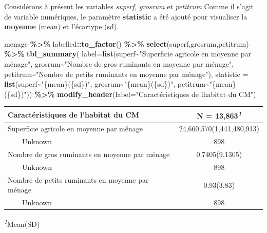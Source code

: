 \documentclass[
]{article}
\newenvironment{Shaded}{\begin{snugshade}}{\end{snugshade}}
\newcommand{\AttributeTok}[1]{\textcolor[rgb]{0.13,0.29,0.53}{#1}}
\newcommand{\FunctionTok}[1]{\textcolor[rgb]{0.13,0.29,0.53}{\textbf{#1}}}
\newcommand{\NormalTok}[1]{#1}
\newcommand{\SpecialCharTok}[1]{\textcolor[rgb]{0.81,0.36,0.00}{\textbf{#1}}}
\newcommand{\StringTok}[1]{\textcolor[rgb]{0.31,0.60,0.02}{#1}}
\begin{document}
Considérons à présent les variables \emph{superf, grosrum} et
\emph{petitrum} Comme il s'agit de variable numériques, le paramètre
\textbf{statistic} a été ajouté pour visualiser la \textbf{moyenne}
(mean) et l'écartype (sd).

\begin{Shaded}
\begin{Highlighting}[]
\NormalTok{menage }\SpecialCharTok{\%\textgreater{}\%}
\NormalTok{  labelled}\SpecialCharTok{::}\FunctionTok{to\_factor}\NormalTok{() }\SpecialCharTok{\%\textgreater{}\%}
  \FunctionTok{select}\NormalTok{(superf,grosrum,petitrum) }\SpecialCharTok{\%\textgreater{}\%}
  \FunctionTok{tbl\_summary}\NormalTok{(}
    \AttributeTok{label=}\FunctionTok{list}\NormalTok{(superf}\SpecialCharTok{\textasciitilde{}}\StringTok{"Superficie agricole en moyenne par ménage"}\NormalTok{,}
\NormalTok{               grosrum}\SpecialCharTok{\textasciitilde{}}\StringTok{"Nombre de gros ruminants en moyenne par ménage"}\NormalTok{,}
\NormalTok{               petitrum}\SpecialCharTok{\textasciitilde{}}\StringTok{"Nombre de petits ruminants en moyenne par ménage"}\NormalTok{),}
    \AttributeTok{statistic =} \FunctionTok{list}\NormalTok{(superf}\SpecialCharTok{\textasciitilde{}}\StringTok{"\{mean\}(\{sd\})"}\NormalTok{,}
\NormalTok{                     grosrum}\SpecialCharTok{\textasciitilde{}}\StringTok{"\{mean\}(\{sd\})"}\NormalTok{,}
\NormalTok{                     petitrum}\SpecialCharTok{\textasciitilde{}}\StringTok{"\{mean\}(\{sd\})"}\NormalTok{)) }\SpecialCharTok{\%\textgreater{}\%}
  \FunctionTok{modify\_header}\NormalTok{(}\AttributeTok{label=}\StringTok{"Caractéristiques de l\textquotesingle{}habitat du CM"}\NormalTok{)}
\end{Highlighting}
\end{Shaded}

\begin{table}[!t]
\fontsize{12.0pt}{14.4pt}\selectfont
\begin{tabular*}{\linewidth}{@{\extracolsep{\fill}}lc}
\toprule
Caractéristiques de l'habitat du CM & \textbf{N = 13,863}\textsuperscript{\textit{1}} \\ 
\midrule\addlinespace[2.5pt]
Superficie agricole en moyenne par ménage & 24,660,570(1,441,480,913) \\ 
    Unknown & 898 \\ 
Nombre de gros ruminants en moyenne par ménage & 0.7405(9.1305) \\ 
    Unknown & 898 \\ 
Nombre de petits ruminants en moyenne par ménage & 0.93(3.83) \\ 
    Unknown & 898 \\ 
\bottomrule
\end{tabular*}
\begin{minipage}{\linewidth}
\textsuperscript{\textit{1}}Mean(SD)\\
\end{minipage}
\end{table}
\end{document}
